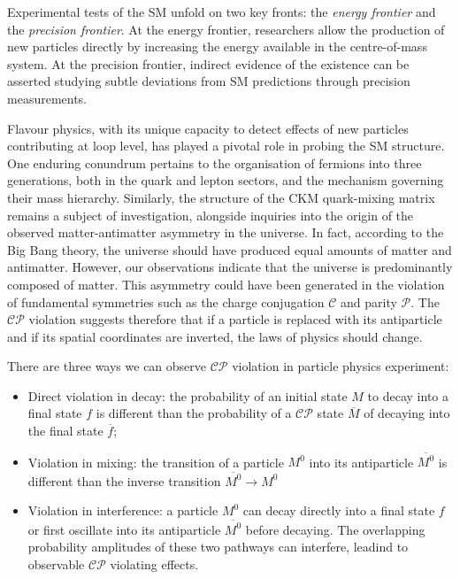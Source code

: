 
Experimental tests of the SM unfold on two key fronts: the \textit{energy frontier} and the \textit{precision frontier}. At the energy frontier, researchers allow the production of new particles directly by increasing the energy available in the centre-of-mass system. At the precision frontier, indirect evidence of the existence can be asserted studying subtle deviations from SM predictions through precision measurements. 

Flavour physics, with its unique capacity to detect effects of new particles contributing at loop level, has played a pivotal role in probing the SM structure. One enduring conundrum pertains to the organisation of fermions into three generations, both in the quark and lepton sectors, and the mechanism governing their mass hierarchy. Similarly, the structure of the CKM quark-mixing matrix remains a subject of investigation, alongside inquiries into the origin of the observed matter-antimatter asymmetry in the universe. In fact, according to the Big Bang theory, the universe should have produced equal amounts of matter and antimatter. However, our observations indicate that the universe is predominantly composed of matter. This asymmetry could have been generated in the violation of fundamental symmetries such as the charge conjugation $\mathcal{C}$ and parity $\mathcal{P}$. The $\mathcal{CP}$ violation suggests therefore that if a particle is replaced with its antiparticle and if its spatial coordinates are inverted, the laws of physics should change. 

There are three ways we can observe $\mathcal{CP}$ violation in particle physics experiment:
 \begin{itemize}
     \item Direct violation in decay: the probability of an initial state $M$ to decay into a final state $f$ is different than the probability of a $\mathcal{CP}$ state $\overline{M}$ of decaying into the final state $\overline{f}$;
     \item Violation in mixing: the transition of a particle $M^0$ into its antiparticle $\overline{M^0}$ is different than the inverse transition $\overline{M^0}\longrightarrow M^0$
     \item Violation in interference: a particle $M^0$ can decay directly into a final state $f$ or first oscillate into its antiparticle $\overline{M^0}$ before decaying. The overlapping probability amplitudes of these two pathways can interfere, leadind to observable $\mathcal{CP}$ violating effects.
 \end{itemize}
 
